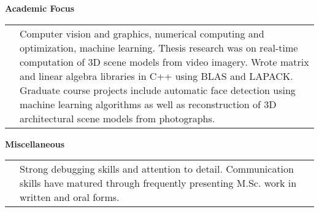\documentclass{res}
\begin{document}
\begin{resume}
    \textbf{Academic Focus}\vspace{0.5ex}\\
    \begin{tabular}{ l L{5.5in} }
    \hspace*{1.2em} & Computer vision and graphics, numerical computing and optimization, machine learning.  Thesis research was on real-time computation of 3D scene models from video imagery.  Wrote matrix and linear algebra libraries in C++ using BLAS and LAPACK.  Graduate course projects include automatic face detection using machine learning algorithms as well as reconstruction of 3D architectural scene models from photographs.\\
    \end{tabular}

    \textbf{Miscellaneous}\vspace{0.5ex}\\
    \begin{tabular}{ l L{5.5in} }
    \hspace*{1.2em} & Strong debugging skills and attention to detail.  Communication skills have matured through frequently presenting M.Sc. work in written and oral forms.\\
    \end{tabular}



\end{resume}
\end{document}
